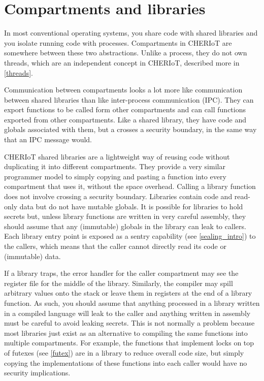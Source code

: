 \chapter[label=compartments]{Compartments and libraries}

In most conventional operating systems, you share code with shared libraries and you isolate running code with processes.
Compartments in CHERIoT are somewhere between these two abstractions.
Unlike a process, they do not own threads, which are an independent concept in CHERIoT, described more in \ref{threads}.

Communication between compartments looks a lot more like communication between shared libraries than like inter-process communication (IPC).
They can export functions to be called form other compartments and can call functions exported from other compartments.
Like a shared library, they have code and globals associated with them, but a  crosses a security boundary, in the same way that an IPC message would.

CHERIoT shared libraries are a lightweight way of reusing code without duplicating it into different compartments.
They provide a very similar programmer model to simply copying and pasting a function into every compartment that uses it, without the space overhead.
Calling a library function does not involve crossing a security boundary.
Libraries contain code and read-only data but do not have mutable globals.
It is possible for libraries to hold secrets but, unless library functions are written in very careful assembly, they should assume that any (immutable) globals in the library can leak to callers.
Each library entry point is exposed as a sentry capability (see \ref{sealing_intro}) to the callers, which means that the caller cannot directly read its code or (immutable) data.

\begin{warning}
If a library traps, the error handler for the caller compartment may see the register file for the middle of the library.
Similarly, the compiler may spill arbitrary values onto the stack or leave them in registers at the end of a library function.
As such, you should assume that anything processed in a library written in a compiled language will leak to the caller and anything written in assembly must be  careful to avoid leaking secrets.
This is not normally a problem because most libraries just exist as an alternative to compiling the same functions into multiple compartments.
For example, the functions that implement locks on top of futexes (see \ref{futex}) are in a library to reduce overall code size, but simply copying the implementations of these functions into each caller would have no security implications.
\end{warning}

